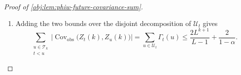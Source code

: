 \begin{proof}[Proof of \cref{obj:lem:phiw-future-covariance-sum}]
\begin{enumerate}
\item Adding the two bounds over the disjoint decomposition of \(\mathscr U_t\) gives
\[
\sum_{\substack{u\in\mathscr T_k\\ t<u}}
\bigl|\operatorname{Cov}_{\mathrm{obs}}\bigl(Z_t(k),Z_u(k)\bigr)\bigr|
=
\sum_{u\in\mathscr U_t}\Gamma_t(u)
\le
\frac{2L^{k+1}}{L-1}+\frac{2}{1-\alpha}.
\]
\end{enumerate}
\end{proof}
